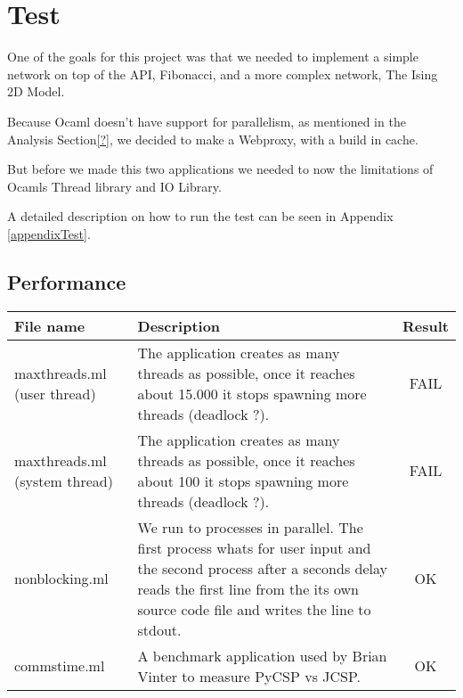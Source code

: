 \documentclass[a4paper,12pt]{article}
\begin{document}
\section{Test}
\label{test}
One of the goals for this project was that we needed to implement a simple
network on top of the API, Fibonacci, and a more complex network, The Ising 2D
Model.

Because Ocaml doesn't have support for parallelism, as mentioned in the Analysis
Section\ref{?}, we decided to make a Webproxy, with a build in cache.

But before we made this two applications we needed to now the limitations of
Ocamls Thread library and IO Library.

A detailed description on how to run the test can be seen in
Appendix \ref{appendixTest}.

\subsection{Performance}

\begin{tabular}{|p{3cm}|p{8.5cm}|c|}
    \hline
    	File name &
	Description &
	Result \\
    \hline
    	maxthreads.ml (user thread) &
        The application creates as many threads as possible, once it reaches
        about 15.000 it stops spawning more threads (deadlock ?).&
	FAIL \\
    \hline
    	maxthreads.ml (system thread) &
        The application creates as many threads as possible, once it reaches
        about 100 it stops spawning more threads (deadlock ?).&
	FAIL \\
    \hline
    	nonblocking.ml &
        We run to processes in parallel. The first process whats for user input
        and the second process after a seconds delay reads the first line from
        the its own source code file and writes the line to stdout.&
	OK \\
    \hline
    	commstime.ml &
        A benchmark application used by Brian Vinter to measure PyCSP vs JCSP.&
	OK \\
    \hline
  \end{tabular} 
\end{document}
